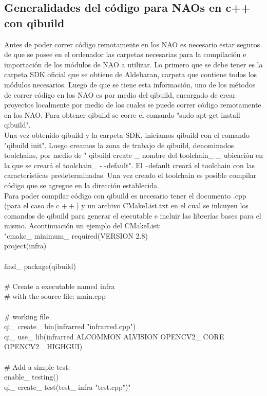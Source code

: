 \documentclass[letterpaper]{article}
\begin{document}
\subsection{Generalidades del código para NAOs en c++ con qibuild}
Antes de poder correr código remotamente en los NAO es necesario estar seguros de que se posee en el ordenador las carpetas necesarias para la compilación e importación de los módulos de NAO a utilizar.
Lo primero que se debe tener es la carpeta SDK oficial que se obtiene de Aldebaran, carpeta que contiene todos los módulos necesarios. Luego de que se tiene esta información, uno de los métodos de correr código en los NAO es por medio del qibuild, encargado de crear proyectos localmente por medio de los cuales se puede correr código remotamente en los NAO. Para obtener qibuild se corre el comando "sudo apt-get install qibuild".\\
Una vez obtenido qibuild y la carpeta SDK, iniciamos qibuild con el comando "qibuild init". Luego creamos la zona de trabajo de qibuild, denominados toolchains, por medio de " qibuild create \_ nombre del toolchain\_  \_ ubicación en la que se creará el toolchain\_   - -default". El --default creará el toolchain con las características predeterminadas. Una vez creado el toolchain es posible compilar código que se agregue en la dirección establecida. \\
Para poder compilar código con qibuild es necesario tener el documento .cpp (para el caso de c $++$) y un archivo CMakeList.txt en el cual se inlcuyen los comandos de qibuild para generar el ejecutable e incluir las librerías bases para el mismo. Acontinuación un ejemplo del CMakeList:\\
"cmake\_ minimum\_ required(VERSION 2.8)\\
project(infra)\\
\\
find\_ package(qibuild)\\
\\
\# Create a executable named infra\\
\# with the source file: main.cpp\\
\\
\# working file\\
qi\_ create\_ bin(infrarred "infrarred.cpp")\\
qi\_ use\_ lib(infrarred ALCOMMON ALVISION OPENCV2\_ CORE OPENCV2\_ HIGHGUI)\\
\\
\# Add a simple test:\\
enable\_ testing()\\
qi\_ create\_ test(test\_ infra "test.cpp")"\\
\end{document}
